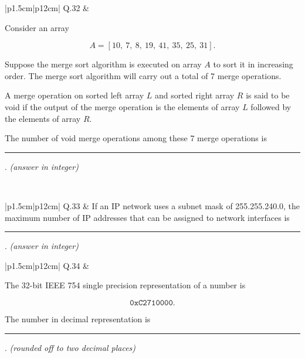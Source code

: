 \documentclass[14pt]{article}
\begin{document}
\vspace{0.3cm}

\begin{tabular}{|p{1.5cm}|p{12cm}|}
\hline
Q.32 &
\parbox[t]{\linewidth}{
Consider an array

\[
A=[10,\ 7,\ 8,\ 19,\ 41,\ 35,\ 25,\ 31].
\]

Suppose the merge sort algorithm is executed on array $A$ to sort it in increasing order. The merge sort algorithm will carry out a total of 7 merge operations.

\vspace{0.2cm}

A merge operation on sorted left array $L$ and sorted right array $R$ is said to be void if the output of the merge operation is the elements of array $L$ followed by the elements of array $R$.

\vspace{0.2cm}

The number of void merge operations among these 7 merge operations is \rule{2cm}{0.15mm}. \textit{(answer in integer)}
}
\\
\hline
\end{tabular}

\vspace{0.3cm}

\begin{tabular}{|p{1.5cm}|p{12cm}|}
\hline
Q.33 &
If an IP network uses a subnet mask of 255.255.240.0, the maximum number of IP addresses that can be assigned to network interfaces is \rule{2cm}{0.15mm}. \textit{(answer in integer)}
\\
\hline
\end{tabular}

\vspace{0.3cm}

\begin{tabular}{|p{1.5cm}|p{12cm}|}
\hline
Q.34 &
\parbox[t]{\linewidth}{
The 32-bit IEEE 754 single precision representation of a number is

\[
\texttt{0xC2710000}.
\]

The number in decimal representation is \rule{2cm}{0.15mm}. \textit{(rounded off to two decimal places)}
}
\\
\hline
\end{tabular}

\vspace{0.3cm}
\end{document}
